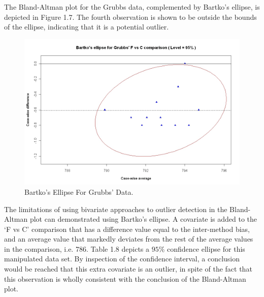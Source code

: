 \documentclass[Main.tex]{subfiles}
\begin{document}
	
	
	The Bland-Altman plot for the Grubbs data, complemented by Bartko's ellipse, is depicted in Figure 1.7.
	The fourth observation is shown to be outside the bounds of the ellipse, indicating that it is a potential outlier.
	
	
	\begin{figure}[h!]
		\includegraphics[width=130mm]{images/GrubbsBartko.jpeg}
		\caption{Bartko's Ellipse For Grubbs' Data.}\label{GrubbsBartko}
	\end{figure}
	
	The limitations of using bivariate approaches to outlier detection
	in the Bland-Altman plot can demonstrated using Bartko's ellipse.
	A covariate is added to the `F vs C' comparison that has a
	difference value equal to the inter-method bias, and an average
	value that markedly deviates from the rest of the average values
	in the comparison, i.e. 786. Table 1.8 depicts a $95\%$ confidence
	ellipse for this manipulated data set. By inspection of the
	confidence interval, a conclusion would be reached that this extra
	covariate is an outlier, in spite of the fact that this
	observation is wholly consistent with the conclusion of the
	Bland-Altman plot.
	
\end{document}
